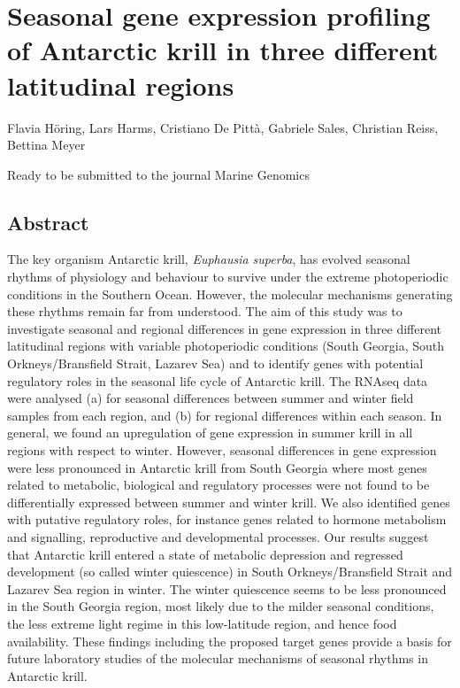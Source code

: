 \chapter[Publication I]{Seasonal gene expression profiling of Antarctic krill in three different latitudinal regions}

Flavia Höring, Lars Harms, Cristiano De Pittà, Gabriele Sales, Christian Reiss,
Bettina Meyer

Ready to be submitted to the journal Marine Genomics

\section*{Abstract}
The key organism Antarctic krill, \textit{Euphausia superba}, has evolved
seasonal rhythms of physiology and behaviour to survive under the extreme
photoperiodic conditions in the Southern Ocean. However, the molecular
mechanisms generating these rhythms remain far from understood. The aim of this
study was to investigate seasonal and regional differences in gene expression
in three different latitudinal regions with variable photoperiodic conditions
(South Georgia, South Orkneys/Bransfield Strait, Lazarev Sea) and to identify
genes with potential regulatory roles in the seasonal life cycle of Antarctic
krill. The RNAseq data were analysed (a) for seasonal differences
between summer and winter field samples from each region, and (b) for
regional differences within each season. In general, we found an upregulation
of gene expression in summer krill in all regions with respect to winter.
However, seasonal differences in gene expression were less pronounced in
Antarctic krill from South Georgia where most genes related to metabolic,
biological and regulatory processes were not found to be differentially
expressed between summer and winter krill. We also identified genes with
putative regulatory roles, for instance genes related to hormone metabolism and
signalling, reproductive and developmental processes. Our results suggest that
Antarctic krill entered a state of metabolic depression and regressed
development (so called winter quiescence) in South Orkneys/Bransfield Strait
and Lazarev Sea region in winter. The winter quiescence seems to be less
pronounced in the South Georgia region, most likely due to the milder seasonal
conditions, the less extreme light regime in this low-latitude region, and
hence food availability. These findings including the proposed target genes
provide a basis for future laboratory studies of the molecular mechanisms of
seasonal rhythms in Antarctic krill.


